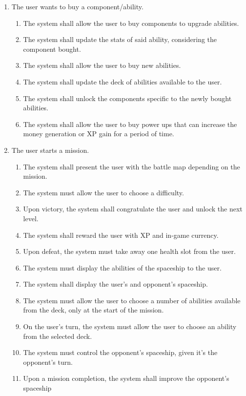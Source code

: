 \documentclass[]{article}
\begin{document}
\begin{enumerate}[{VP}1.]
\begin{enumerate}[{BE1}.1]
		
		\item The user wants to buy a component/ability.
		\begin{enumerate}
		    \item The system shall allow the user to buy components to upgrade abilities. 
		    \item The system shall update the stats of said ability, considering the component bought. 
		    \item The system shall allow the user to buy new abilities. 
		    \item The system shall update the deck of abilities available to the user. 
		    \item The system shall unlock the components specific to the newly bought abilities. 
		    \item The system shall allow the user to buy power ups that can increase the money generation or XP gain for a period of time. 

		\end{enumerate}	
		
		\item The user starts a mission. 
		\begin{enumerate}
		    \item The system shall present the user with the battle map depending on the mission. 
		    \item The system must allow the user to choose a difficulty.
            \item Upon victory, the system shall congratulate the user and unlock the next level. 
            \item The system shall reward the user with XP and in-game currency. 
            \item Upon defeat, the system must take away one health slot from the user.%
            \item The system must display the abilities of the spaceship to the user.
            \item The system shall display the user's and opponent's spaceship.
            \item The system must allow the user to choose a number of abilities available from the deck, only at the start of the mission. 
            \item On the user's turn, the system must allow the user to choose an ability from the selected deck.
            \item The system must control the opponent's spaceship, given it's the opponent's turn. 
            \item Upon a mission completion, the system shall improve the opponent's spaceship
		\end{enumerate}
		


\end{enumerate}
\end{enumerate}
\end{document}
